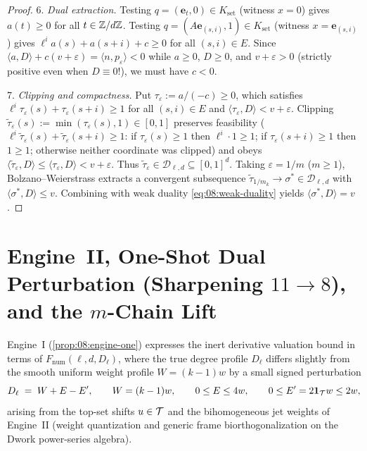 \begin{proof}
6. \emph{Dual extraction.} Testing $q = (\mathbf{e}_t, 0) \in K_{\mathrm{set}}$ (witness $x = 0$) gives $a(t) \ge 0$ for all $t \in \mathbb{Z}/d\mathbb{Z}$. Testing $q = (A\mathbf{e}_{(s,i)}, 1) \in K_{\mathrm{set}}$ (witness $x = \mathbf{e}_{(s,i)}$) gives $\ell^i a(s) + a(s + i) + c \ge 0$ for all $(s, i) \in E$. Since $\langle a, D \rangle + c(v + \varepsilon) = \langle n, p_\varepsilon \rangle < 0$ while $a \ge 0$, $D \ge 0$, and $v + \varepsilon > 0$ (strictly positive even when $D \equiv 0$!), we must have $c < 0$.

7. \emph{Clipping and compactness.} Put $\tau_\varepsilon := a / (-c) \ge 0$, which satisfies $\ell^i \tau_\varepsilon(s) + \tau_\varepsilon(s + i) \ge 1$ for all $(s, i) \in E$ and $\langle \tau_\varepsilon, D \rangle < v + \varepsilon$. Clipping $\widetilde{\tau}_\varepsilon(s) := \min(\tau_\varepsilon(s), 1) \in [0, 1]$ preserves feasibility ($\ell^i \widetilde{\tau}_\varepsilon(s) + \widetilde{\tau}_\varepsilon(s + i) \ge 1$: if $\tau_\varepsilon(s) \ge 1$ then $\ell^i \cdot 1 \ge 1$; if $\tau_\varepsilon(s+i) \ge 1$ then $1 \ge 1$; otherwise neither coordinate was clipped) and obeys $\langle \widetilde{\tau}_\varepsilon, D \rangle \le \langle \tau_\varepsilon, D \rangle < v + \varepsilon$. Thus $\widetilde{\tau}_\varepsilon \in \mathcal{D}_{\ell, d} \subseteq [0, 1]^d$. Taking $\varepsilon = 1/m$ ($m \ge 1$), Bolzano--Weierstrass extracts a convergent subsequence $\widetilde{\tau}_{1/m_k} \to \sigma^* \in \mathcal{D}_{\ell, d}$ with $\langle \sigma^*, D \rangle \le v$. Combining with weak duality \eqref{eq:08:weak-duality} yields $\langle \sigma^*, D \rangle = v$.
\end{proof}

\section{Engine~II, One-Shot Dual Perturbation (Sharpening $11 \to 8$), and the $m$-Chain Lift}
\label{sec:08:engine-two}

Engine~I (\cref{prop:08:engine-one}) expresses the inert derivative valuation bound in terms of $F_{\mathrm{num}}(\ell, d, D_\ell)$, where the true degree profile $D_\ell$ differs slightly from the smooth uniform weight profile $W = (k - 1)w$ by a small signed perturbation
\begin{equation}
\label{eq:08:D-perturb}
  D_\ell \;=\; W + E - E', \qquad W = (k - 1) w, \qquad 0 \le E \le 4 w, \qquad 0 \le E' = 2\mathbf{1}_{\mathcal{T}} w \le 2 w,
\end{equation}
arising from the top-set shifts $u \in \mathcal{T}$ and the bihomogeneous jet weights of Engine~II (weight quantization and generic frame biorthogonalization on the Dwork power-series algebra).

